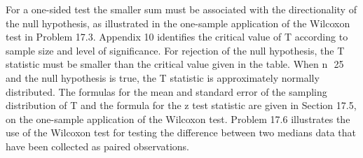 For a one-sided test the smaller sum must be associated with the directionality of the null hypothesis, as
illustrated in the one-sample application of the Wilcoxon test in Problem 17.3. Appendix 10 identifies the
critical value of T according to sample size and level of significance. For rejection of the null hypothesis, the T
statistic must be smaller than the critical value given in the table.
When n  25 and the null hypothesis is true, the T statistic is approximately normally distributed. The
formulas for the mean and standard error of the sampling distribution of T and the formula for the z test statistic
are given in Section 17.5, on the one-sample application of the Wilcoxon test.
Problem 17.6 illustrates the use of the Wilcoxon test for testing the difference between two medians data
that have been collected as paired observations.
